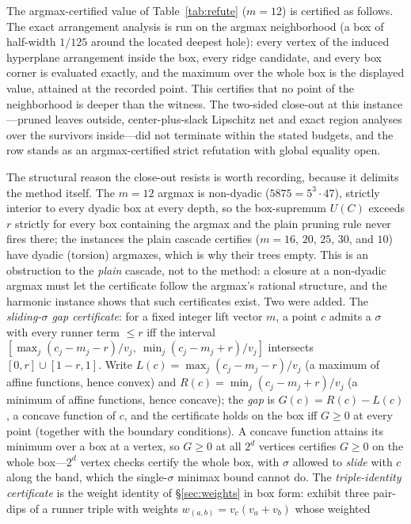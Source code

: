 \documentclass[11pt,a4paper]{article}
\numberwithin{equation}{section}
\theoremstyle{plain}
\theoremstyle{definition}
\theoremstyle{remark}
\begin{document}
The argmax-certified value of Table~\ref{tab:refute} ($m=12$) is
certified as follows. The exact arrangement analysis is run on the
argmax neighborhood (a box of half-width $1/125$ around the located
deepest hole): every vertex of the induced hyperplane arrangement
inside the box, every ridge candidate, and every box corner is
evaluated exactly, and the maximum over the whole box is the displayed
value, attained at the recorded point. This certifies that no point of
the neighborhood is deeper than the witness. The two-sided close-out at
this instance---pruned leaves outside, center-plus-slack Lipschitz net
and exact region analyses over the survivors inside---did not
terminate within the stated budgets, and the row stands as an
argmax-certified strict refutation with global equality open.

The structural reason the close-out resists is worth recording, because
it delimits the method itself. The $m=12$ argmax is non-dyadic
($5875=5^3\cdot47$), strictly interior to every dyadic box at every
depth, so the box-supremum $U(C)$ exceeds $r$ strictly for every box
containing the argmax and the plain pruning rule never fires there;
the instances the plain cascade certifies ($m=16$, $20$, $25$, $30$,
and $10$) have dyadic (torsion) argmaxes, which is why their trees
empty. This is an obstruction to the \emph{plain} cascade, not to the
method: a closure at a non-dyadic argmax must let the certificate
follow the argmax's rational structure, and the harmonic instance
shows that such certificates exist. Two were added. The
\emph{sliding-$\sigma$ gap certificate}: for a fixed integer lift
vector $m$, a point $c$ admits a $\sigma$ with every runner term $\le
r$ iff the interval
$[\max_j (c_j-m_j-r)/v_j,\ \min_j (c_j-m_j+r)/v_j]$ intersects
$[0,r]\cup[1-r,1]$. Write $L(c)=\max_j(c_j-m_j-r)/v_j$ (a maximum of
affine functions, hence convex) and $R(c)=\min_j(c_j-m_j+r)/v_j$ (a
minimum of affine functions, hence concave); the \emph{gap} is
$G(c)=R(c)-L(c)$, a concave function of $c$, and the certificate holds
on the box iff $G\ge0$ at every point (together with the boundary
conditions). A concave function attains its minimum over a box at a
vertex, so $G\ge0$ at all $2^d$ vertices certifies $G\ge0$ on the whole
box---$2^d$ vertex checks certify the whole box, with $\sigma$ allowed
to \emph{slide} with $c$ along the band, which the single-$\sigma$
minimax bound cannot do. The \emph{triple-identity certificate} is the weight
identity of \S\ref{sec:weights} in box form: exhibit three pair-dips of
a runner triple with weights $w_{(a,b)}=v_c(v_a{+}v_b)$ whose weighted
\end{document}
